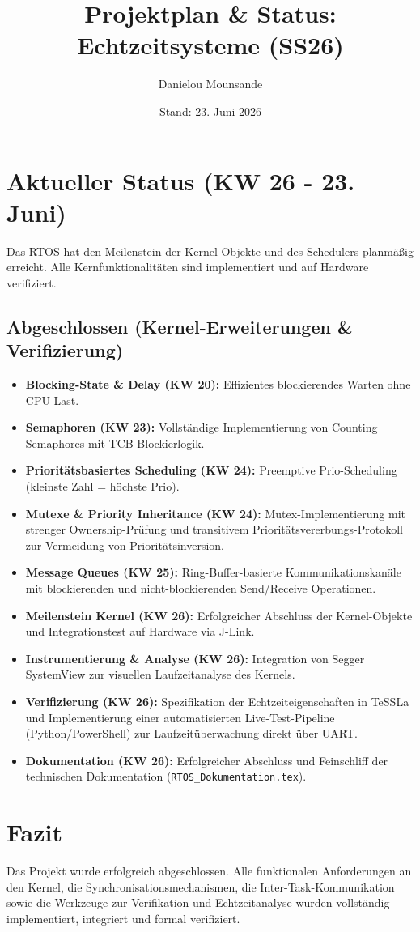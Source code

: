 \documentclass[11pt,a4paper]{article}
\title{Projektplan \& Status: Echtzeitsysteme (SS26)}
\author{Danielou Mounsande}
\date{Stand: 23. Juni 2026}
\begin{document}
\maketitle

\section{Aktueller Status (KW 26 - 23. Juni)}
Das RTOS hat den Meilenstein der Kernel-Objekte und des Schedulers planmäßig erreicht. Alle Kernfunktionalitäten sind implementiert und auf Hardware verifiziert.

\subsection{Abgeschlossen (Kernel-Erweiterungen \& Verifizierung)}
\begin{itemize}
    \item \textbf{Blocking-State \& Delay (KW 20):} Effizientes blockierendes Warten ohne CPU-Last.
    \item \textbf{Semaphoren (KW 23):} Vollständige Implementierung von Counting Semaphores mit TCB-Blockierlogik.
    \item \textbf{Prioritätsbasiertes Scheduling (KW 24):} Preemptive Prio-Scheduling (kleinste Zahl = höchste Prio).
    \item \textbf{Mutexe \& Priority Inheritance (KW 24):} Mutex-Implementierung mit strenger Ownership-Prüfung und transitivem Prioritätsvererbungs-Protokoll zur Vermeidung von Prioritätsinversion.
    \item \textbf{Message Queues (KW 25):} Ring-Buffer-basierte Kommunikationskanäle mit blockierenden und nicht-blockierenden Send/Receive Operationen.
    \item \textbf{Meilenstein Kernel (KW 26):} Erfolgreicher Abschluss der Kernel-Objekte und Integrationstest auf Hardware via J-Link.
    \item \textbf{Instrumentierung \& Analyse (KW 26):} Integration von Segger SystemView zur visuellen Laufzeitanalyse des Kernels.
    \item \textbf{Verifizierung (KW 26):} Spezifikation der Echtzeiteigenschaften in TeSSLa und Implementierung einer automatisierten Live-Test-Pipeline (Python/PowerShell) zur Laufzeitüberwachung direkt über UART.
    \item \textbf{Dokumentation (KW 26):} Erfolgreicher Abschluss und Feinschliff der technischen Dokumentation (\texttt{RTOS\_Dokumentation.tex}).
\end{itemize}

\section{Fazit}
Das Projekt wurde erfolgreich abgeschlossen. Alle funktionalen Anforderungen an den Kernel, die Synchronisationsmechanismen, die Inter-Task-Kommunikation sowie die Werkzeuge zur Verifikation und Echtzeitanalyse wurden vollständig implementiert, integriert und formal verifiziert.
\end{document}
